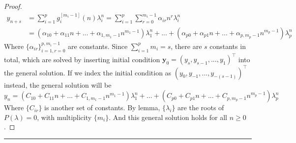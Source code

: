 \documentclass[a4paper, 10pt]{article}
\theoremstyle{definition}
\theoremstyle{hSol}
\begin{document}
\begin{proof}
\begin{equation}
\begin{split}
    y_{n+s} &= \sum_{i=1}^p g^{[m_i-1]}_i(n) \lambda_i^n = \sum_{i=1}^p  \sum_{r=0}^{m_i-1} \alpha_{ir} n^r \lambda_i^n \\
    &= (\alpha_{10} + \alpha_{11}n + ... + \alpha_{1,m_1-1} n^{m_1-1}) \lambda_1^n + ... + (\alpha_{p0} + \alpha_{p1}n + ... + \alpha_{p,m_p-1} n^{m_p-1}) \lambda_p^n
  \end{split}
\end{equation}
Where $\{\alpha_{ir}\}_{i=1, r=0}^{p, m_i-1}$ are constants. Since $\sum_{i=1}^p m_i = s$, there are $s$ constants in total, which are solved by inserting initial condition $\bm{y}_0=(y_s, y_{s-1}, ..., y_1)^{\top}$ into the general solution. If we index the initial condition as $(y_0, y_{-1}, ..., y_{-(s-1)})^{\top}$ instead, the general solution will be
$$
y_{n} = (C_{10} + C_{11}n + ... + C_{1,m_1-1} n^{m_1-1}) \lambda_1^n + ... + (C_{p0} + C_{p1}n + ... + C_{p,m_p-1} n^{m_p-1}) \lambda_p^n
$$
Where $\{C_{ir}\}$ is another set of constants. By lemma, $\{\lambda_i\}$ are the roots of $P(\lambda)=0$, with multiplicity $\{m_i\}$. And this general solution holds for all $n\geq 0$.

\end{proof}
\noindent\rule{16cm}{0.4pt}
\end{document}
